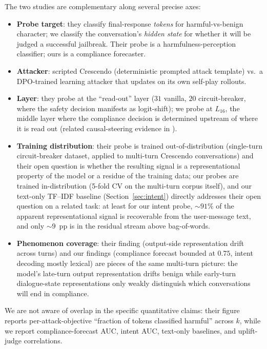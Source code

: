 \documentclass[11pt]{article}
\begin{document}
The two studies are complementary along several precise axes:

\begin{itemize}[leftmargin=*]
  \item \textbf{Probe target}: they classify final-response \emph{tokens} for harmful-vs-benign character; we classify the conversation's \emph{hidden state} for whether it will be judged a successful jailbreak. Their probe is a harmfulness-perception classifier; ours is a compliance forecaster.
  \item \textbf{Attacker}: scripted Crescendo (deterministic prompted attack template) vs.\ a DPO-trained learning attacker that updates on its own self-play rollouts.
  \item \textbf{Layer}: they probe at the ``read-out'' layer ($31$ vanilla, $20$ circuit-breaker, where the safety decision manifests as logit-shift); we probe at $L_{16}$, the middle layer where the compliance decision is determined upstream of where it is read out (related causal-steering evidence in \citet{wu2026knowingwithoutacting}).
  \item \textbf{Training distribution}: their probe is trained out-of-distribution (single-turn circuit-breaker dataset, applied to multi-turn Crescendo conversations) and their open question is whether the resulting signal is a representational property of the model or a residue of the training data; our probes are trained in-distribution (5-fold CV on the multi-turn corpus itself), and our text-only TF--IDF baseline (Section~\ref{sec:intent}) directly addresses their open question on a related task: at least for our intent probe, $\sim 91$\% of the apparent representational signal is recoverable from the user-message text, and only $\sim 9$~pp is in the residual stream above bag-of-words.
  \item \textbf{Phenomenon coverage}: their finding (output-side representation drift across turns) and our findings (compliance forecast bounded at $0.75$, intent decoding mostly lexical) are pieces of the same multi-turn picture: the model's late-turn output representation drifts benign while early-turn dialogue-state representations only weakly distinguish which conversations will end in compliance.
\end{itemize}

We are not aware of overlap in the specific quantitative claims: their figure reports per-attack-objective ``fraction of tokens classified harmful'' across $k$, while we report compliance-forecast AUC, intent AUC, text-only baselines, and uplift-judge correlations.
\end{document}
